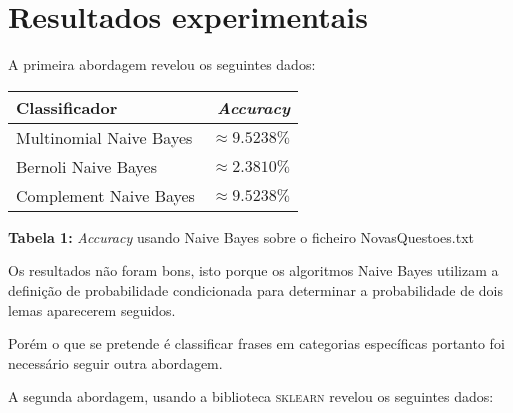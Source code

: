 \documentclass[12pt]{article}
\begin{document}
\break
\section*{Resultados experimentais}
A primeira abordagem revelou os seguintes dados:

\begin{center}
    \begin{tabular}{ l | r }
      \hline
      \textbf{Classificador} & \textbf{\textit{Accuracy}} \\ \hline
      Multinomial Naive Bayes & $\approx 9.5238\%$ \\ \hline
      Bernoli Naive Bayes & $\approx2.3810\%$ \\ \hline
      Complement Naive Bayes & $\approx 9.5238\%$ \\
      \hline
    \end{tabular}
  \end{center}
  \textbf{Tabela 1:} \textit{Accuracy} usando Naive Bayes sobre o ficheiro NovasQuestoes.txt \newline

Os resultados não foram bons, isto porque os algoritmos Naive Bayes utilizam a definição de probabilidade condicionada para determinar a probabilidade de dois lemas aparecerem seguidos.

Porém o que se pretende é classificar frases em categorias específicas portanto foi necessário seguir outra abordagem. \newline

A segunda abordagem, usando a biblioteca \textsc{sklearn} revelou os seguintes dados:
\end{document}
